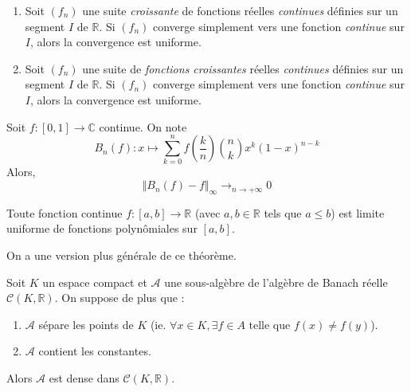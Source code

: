 
	\begin{theorem}
		\begin{enumerate}[label=(\roman*)]
			\item Soit $(f_n)$ une suite \textit{croissante} de fonctions réelles \textit{continues} définies sur un segment $I$ de $\mathbb{R}$. Si $(f_n)$ converge simplement vers une fonction \textit{continue} sur $I$, alors la convergence est uniforme.
			\item Soit $(f_n)$ une suite de \textit{fonctions croissantes} réelles \textit{continues} définies sur un segment $I$ de $\mathbb{R}$. Si $(f_n)$ converge simplement vers une fonction \textit{continue} sur $I$, alors la convergence est uniforme.
		\end{enumerate}
	\end{theorem}


	\begin{theorem}[Bernstein]
		Soit $f : [0,1] \rightarrow \mathbb{C}$ continue. On note
		\[ B_n(f) : x \mapsto \sum_{k=0}^{n} f\left(\frac{k}{n}\right) \binom{n}{k} x^k (1-x)^{n-k} \]
		Alors,
		\[ \Vert B_n(f) - f \Vert_\infty \longrightarrow_{n \rightarrow +\infty} 0 \]
	\end{theorem}


	\begin{corollary}[Weierstrass]
		Toute fonction continue $f : [a,b] \rightarrow \mathbb{R}$ (avec $a, b \in \mathbb{R}$ tels que $a \leq b$) est limite uniforme de fonctions polynômiales sur $[a, b]$.
	\end{corollary}

	On a une version plus générale de ce théorème.


	\begin{theorem}
		Soit $K$ un espace compact et $\mathcal{A}$ une sous-algèbre de l'algèbre de Banach réelle $\mathcal{C}(K, \mathbb{R})$. On suppose de plus que :
		\begin{enumerate}[label=(\roman*)]
			\item $\mathcal{A}$ sépare les points de $K$ (ie. $\forall x \in K, \exists f \in A \text{ telle que } f(x) \neq f(y)$).
			\item $\mathcal{A}$ contient les constantes.
		\end{enumerate}
		Alors $\mathcal{A}$ est dense dans $\mathcal{C}(K, \mathbb{R})$.
	\end{theorem}

